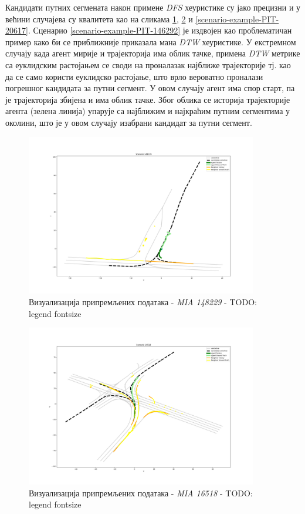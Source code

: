 \documentclass[11pt,oneside]{memoir}
\begin{document}
Кандидати путних сегмената након примене \textit{DFS} хеуристике су јако прецизни и у већини случајева су квалитета као на
сликама \ref{scenario-example-MIA-148229}, \ref{scenario-example-MIA-16518} и \ref{scenario-example-PIT-20617}. Сценарио 
\ref{scenario-example-PIT-146292} је издвојен као проблематичан пример како би се приближније приказала мана \textit{DTW} хеуристике.
У екстремном случају када агент мирије и трајекторија има облик тачке, примена \textit{DTW} метрике са еуклидским растојањем се своди на
проналазак најближе трајекторије тј. као да се само користи еуклидско растојање, што врло вероватно проналази погрешног кандидата за путни сегмент.
У овом случају агент има спор старт, па је трајекторија збијена и има облик тачке. Због облика се историја трајекторије агента (зелена линија)
упарује са најближим и најкраћим путним сегментима у околини, што је у овом случају изабрани кандидат за путни сегмент.

\begin{figure}[H]
  \includegraphics[width=0.9\textwidth]{images/scenario_MIA_148229.png}
  \caption{Визуализација припремљених података - \textit{MIA 148229} - TODO: legend fontsize}
  \label{scenario-example-MIA-148229}
\end{figure}

\begin{figure}[H]
  \includegraphics[width=0.9\textwidth]{images/scenario_MIA_16518.png}
  \caption{Визуализација припремљених података - \textit{MIA 16518} - TODO: legend fontsize}
  \label{scenario-example-MIA-16518}
\end{figure}
\end{document}
